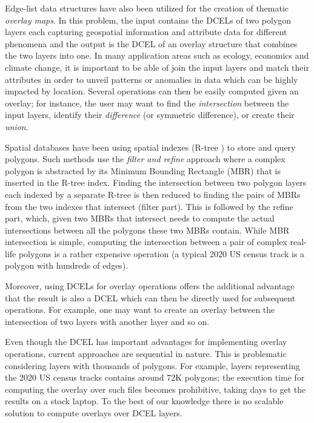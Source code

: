Edge-list data structures have also been utilized for the creation of thematic \textit{overlay maps}. In this problem, the input contains the DCELs of two polygon layers each capturing geospatial information and attribute data for different phenomena and the output is the DCEL of an overlay structure that combines the two layers into one. In many application areas such as ecology, economics and climate change, it is important to be able of join the input layers and match their attributes in order to unveil patterns or anomalies in data which can be highly impacted by location. Several operations can then be easily computed given an overlay; for instance, the user may want to find the \textit{intersection} between the input layers, identify their \textit{difference} (or symmetric difference), or create their \textit{union}. 

Spatial databases have been using spatial indexes (R-tree \cite{rtree, rstar}) to store and query polygons. Such methods use the \textit{filter and refine} approach where a complex polygon is abstracted by its Minimum Bounding Rectangle (MBR) that is inserted in the R-tree index. Finding the intersection between two polygon layers each indexed by a separate R-tree is then reduced to finding the pairs of MBRs from the two indexes that intersect (filter part). This is followed by the refine part, which, given two MBRs that intersect needs to compute the actual intersections between all the polygons these two MBRs contain. While MBR intersection is simple, computing the intersection between a pair of complex real-life polygons is a rather expensive operation (a typical 2020 US census track is a polygon with hundreds of edges). 

Moreover, using DCELs for overlay operations offers the additional advantage that the result is also a DCEL which can then be directly used for subsequent operations. For example, one may want to create an overlay between the intersection of two layers with another layer and so on. 


Even though the DCEL has important advantages for implementing overlay operations, current approaches are sequential in nature. This is problematic considering layers with thousands of polygons. For example, layers representing the 2020 US census tracks contains around 72K polygons; the execution time for computing the overlay over such files becomes prohibitive, taking days to get the results on a stock laptop. To the best of our knowledge there is no scalable solution to compute overlays over DCEL layers.

